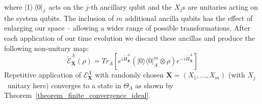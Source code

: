 \documentclass[10pt]{amsart}
\newcommand{\X}{\textbf{X}}
\newcommand{\dmat}[1]{{| #1 \rangle \langle #1 |}}
\begin{document}
where $\ket{1}\bra{0}_j$ acts on the $j$-th ancillary qubit and the $X_j$s are unitaries acting on the system qubits. The inclusion of $m$ additional ancilla qubits has the effect of enlarging our space -- allowing a wider range of possible transformations. After each application of our time evolution we discard these ancillas and  produce the following non-unitary map: 
\begin{equation}
\label{eq_map}
 \widetilde{\mathcal{E}}^{\Lambda}_{\X}(\rho)= Tr_A [ e^{i\widetilde{H}^{\Lambda}_{\X}} (\dmat{0}^{m}_A\otimes \rho) e^{-i\widetilde{H}^{\Lambda}_{\X}} ] 
 \end{equation}
Repetitive application of $\mathcal{E}^{\Lambda}_{\X}$ with randomly chosen $\X = (X_1, \ldots, X_m)$ (with $X_j$ \ unitary here) converges to a state in $\Theta_{\Lambda}$ as shown by Theorem~\ref{theorem_finite_convergence_ideal}.
\end{document}

